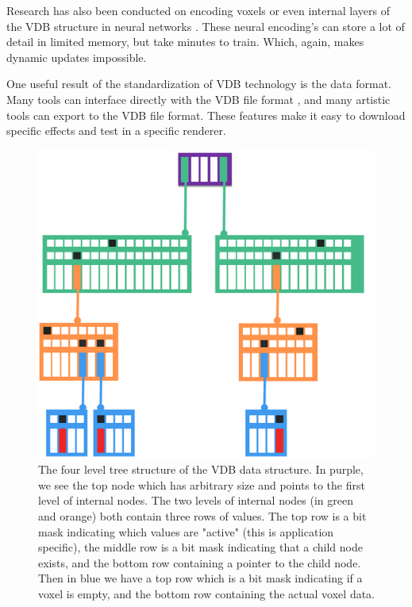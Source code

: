 Research has also been conducted on encoding voxels or even internal layers of the VDB structure in neural networks \cite{kim2022neuralvdb}. These neural encoding's can store a lot of detail in limited memory, but take minutes to train. Which, again, makes dynamic updates impossible.

One useful result of the standardization of VDB technology is the data format. Many tools can interface directly with the VDB file format \cite{VDBADeepDive}, and many artistic tools can export to the VDB file format. These features make it easy to download specific effects and test in a specific renderer.

\begin{figure}
    \centering
    \includegraphics[width=\linewidth]{figures/OpenVDB.png}
    \caption{The four level tree structure of the VDB data structure. In purple, we see the top node which has arbitrary size and points to the first level of internal nodes. The two levels of internal nodes (in green and orange) both contain three rows of values. The top row is a bit mask indicating which values are "active" (this is application specific), the middle row is a bit mask indicating that a child node exists, and the bottom row containing a pointer to the child node. Then in blue we have a top row which is a bit mask indicating if a voxel is empty, and the bottom row containing the actual voxel data. \cite{museth2013vdb}}
    \label{fig:VDB}
\end{figure}





